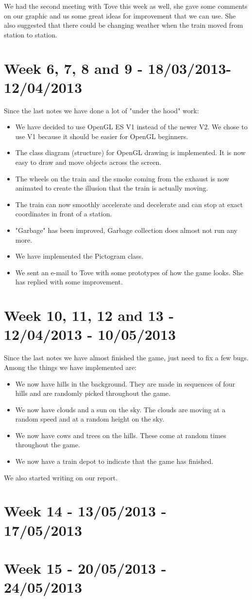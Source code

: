 We had the second meeting with Tove this week as well, she gave some comments on our graphic and us some great ideas for improvement that we can use. She also suggested that there could be changing weather when the train moved from station to station. 

\section*{Week 6, 7, 8 and 9 - 18/03/2013-12/04/2013}
Since the last notes we have done a lot of "under the hood" work:

\begin{itemize}
\item We have decided to use OpenGL ES V1 instead of the newer V2. We chose to use V1 because it should be easier for OpenGL beginners. 
\item The class diagram (structure) for OpenGL drawing is implemented. It is now easy to draw and move objects across the screen. 
\item The wheels on the train and the smoke coming from the exhaust is now animated to create the illusion that the train is actually moving. 
\item The train can now smoothly accelerate and decelerate and can stop at exact coordinates in front of a station. 
\item "Garbage" has been improved, Garbage collection does almost not run any more. 
\item We have implemented the Pictogram class.
\item We sent an e-mail to Tove with some prototypes of how the game looks. She has replied with some improvement.
\end{itemize} 

\section*{Week 10, 11, 12 and 13 - 12/04/2013 - 10/05/2013}
Since the last notes we have almost finished the game, just need to fix a few bugs. Among the things we have implemented are:

\begin{itemize}
\item We now have hills in the background. They are made in sequences of four hills and are randomly picked throughout the game. 
\item We now have clouds and a sun on the sky. The clouds are moving at a random speed and at a random height on the sky. 
\item We now have cows and trees on the hills. These come at random times throughout the game.
\item We now have a train depot to indicate that the game has finished. 
\end{itemize}
We also started writing on our report. 

\section*{Week 14 - 13/05/2013 - 17/05/2013}
\section*{Week 15 - 20/05/2013 - 24/05/2013}
